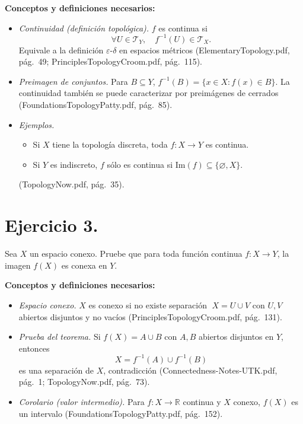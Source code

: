 \documentclass[a4paper,11pt]{article}  %
\begin{document}
\medskip
\textbf{Conceptos y definiciones necesarios:}
\begin{itemize}
  \item \emph{Continuidad (definición topológica).}  
    \(f\) es continua si
    \[
      \forall U\in\mathcal{T}_Y,\quad f^{-1}(U)\in\mathcal{T}_X.
    \]
    Equivale a la definición \(\varepsilon\)-\(\delta\) en espacios métricos (ElementaryTopology.pdf, pág.\ 49; PrinciplesTopologyCroom.pdf, pág.\ 115).
  \item \emph{Preimagen de conjuntos.}  
    Para \(B\subseteq Y\), \(f^{-1}(B)=\{x\in X:f(x)\in B\}\). La continuidad también se puede caracterizar por preimágenes de cerrados (FoundationsTopologyPatty.pdf, pág.\ 85).
  \item \emph{Ejemplos.}  
    \begin{itemize}
      \item Si \(X\) tiene la topología discreta, toda \(f\colon X\to Y\) es continua.
      \item Si \(Y\) es indiscreto, \(f\) sólo es continua si \(\mathrm{Im}(f)\subseteq\{\varnothing,X\}\).
    \end{itemize}
    (TopologyNow.pdf, pág.\ 35).
\end{itemize}

\bigskip

\section*{Ejercicio 3.} 
Sea \(X\) un espacio conexo. Pruebe que para toda función continua \(f\colon X\to Y\), la imagen \(f(X)\) es conexa en \(Y\).

\medskip
\textbf{Conceptos y definiciones necesarios:}
\begin{itemize}
  \item \emph{Espacio conexo.}  
    \(X\) es conexo si no existe separación
    \(\;X=U\cup V\)\; con \(U,V\) abiertos disjuntos y no vacíos (PrinciplesTopologyCroom.pdf, pág.\ 131).
  \item \emph{Prueba del teorema.}  
    Si \(f(X)=A\cup B\) con \(A,B\) abiertos disjuntos en \(Y\), entonces 
    \[
      X = f^{-1}(A)\cup f^{-1}(B)
    \]
    es una separación de \(X\), contradicción (Connectedness-Notes-UTK.pdf, pág.\ 1; TopologyNow.pdf, pág.\ 73).
  \item \emph{Corolario (valor intermedio).}  
    Para \(f\colon X\to\mathbb{R}\) continua y \(X\) conexo, \(f(X)\) es un intervalo (FoundationsTopologyPatty.pdf, pág.\ 152).
\end{itemize}
\end{document}
